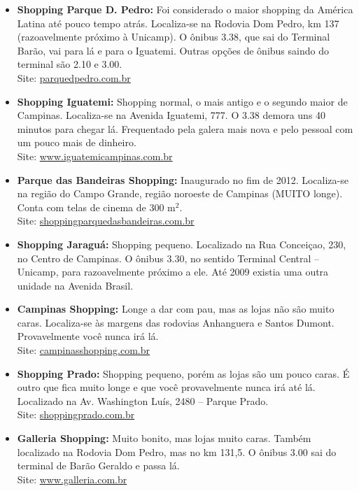 \begin{itemize}
    \item   \textbf{Shopping Parque D. Pedro:} Foi considerado o maior shopping
        da América Latina até pouco tempo atrás. Localiza-se na Rodovia Dom
        Pedro, km 137 (razoavelmente próximo à Unicamp). O ônibus 3.38, que sai
        do Terminal Barão, vai para lá e para o Iguatemi. Outras opções de
        ônibus saindo do terminal são 2.10 e 3.00.
        \\Site: \url{parquedpedro.com.br}

    \item   \textbf{Shopping Iguatemi:} Shopping normal, o mais antigo e o
        segundo maior de Campinas. Localiza-se na Avenida Iguatemi, 777. O 3.38
        demora uns 40 minutos para chegar lá. Frequentado pela galera mais nova
        e pelo pessoal com um pouco mais de dinheiro.
        \\Site: \url{www.iguatemicampinas.com.br}

    \item   \textbf{Parque das Bandeiras Shopping:} Inaugurado no fim de 2012.
        Localiza-se na região do Campo Grande, região noroeste de Campinas 
        (MUITO longe). Conta com telas de cinema de 300 m$^{2}$.
        \\Site: \url{shoppingparquedasbandeiras.com.br}

    \item   \textbf{Shopping Jaraguá:} Shopping pequeno. Localizado na Rua Conceiçao, 
         230, no Centro de Campinas. O ônibus 3.30, no sentido Terminal Central -- Unicamp,
         para razoavelmente próximo a ele. Até 2009 existia uma outra unidade na 
         Avenida Brasil.

    \item   \textbf{Campinas Shopping:} Longe a dar com pau, mas as lojas não
        são muito caras. Localiza-se às margens das rodovias Anhanguera e Santos
        Dumont. Provavelmente você nunca irá lá.
        \\Site: \url{campinasshopping.com.br}

    \item   \textbf{Shopping Prado:} Shopping pequeno, porém as lojas são um 
        pouco caras. É outro que fica muito longe e que você provavelmente nunca 
        irá até lá. Localizado na Av. Washington Luís, 2480 -- Parque Prado.
        \\Site: \url{shoppingprado.com.br}

    \item   \textbf{Galleria Shopping:} Muito bonito, mas lojas muito caras.
        Também localizado na Rodovia Dom Pedro, mas no km 131,5. O ônibus 3.00
        sai do terminal de Barão Geraldo e passa lá.
        \\Site: \url{www.galleria.com.br}


\end{itemize}
